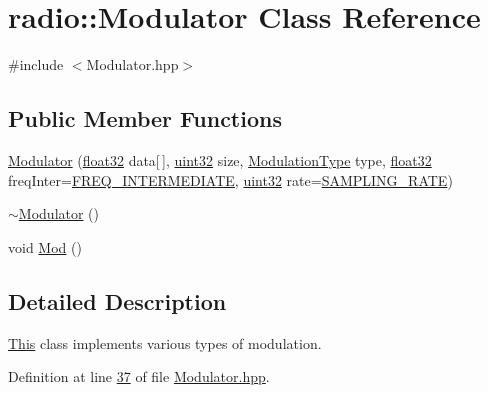 \hypertarget{classradio_1_1Modulator}{\section{radio\+:\+:Modulator Class Reference}
\label{classradio_1_1Modulator}
}


{\ttfamily \#include $<$Modulator.\+hpp$>$}

\subsection*{Public Member Functions}
\begin{DoxyCompactItemize}
\item 
\hyperlink{classradio_1_1Modulator_ab202651b368986cc76673b6e997550b8}{Modulator} (\hyperlink{definitions_8hpp_aacdc525d6f7bddb3ae95d5c311bd06a1}{float32} data\mbox{[}$\,$\mbox{]}, \hyperlink{definitions_8hpp_a1134b580f8da4de94ca6b1de4d37975e}{uint32} size, \hyperlink{namespaceradio_a46fb7299001138f28b7f69975c58399e}{Modulation\+Type} type, \hyperlink{definitions_8hpp_aacdc525d6f7bddb3ae95d5c311bd06a1}{float32} freq\+Inter=\hyperlink{namespaceradio_aa82ddc6ba206798fd70ffc25665b3cb6}{F\+R\+E\+Q\+\_\+\+I\+N\+T\+E\+R\+M\+E\+D\+I\+A\+T\+E}, \hyperlink{definitions_8hpp_a1134b580f8da4de94ca6b1de4d37975e}{uint32} rate=\hyperlink{namespaceradio_a284213fea4beed2f74bb936927cbe654}{S\+A\+M\+P\+L\+I\+N\+G\+\_\+\+R\+A\+T\+E})
\item 
\hyperlink{classradio_1_1Modulator_a712e6e110c57b29ebdd754bd34bf269b}{$\sim$\+Modulator} ()
\item 
void \hyperlink{classradio_1_1Modulator_ab5eac6e4900579486b5871b48e64cdab}{Mod} ()
\end{DoxyCompactItemize}


\subsection{Detailed Description}
\hyperlink{namespaceThis}{This} class implements various types of modulation. 

Definition at line \hyperlink{Modulator_8hpp_source_l00037}{37} of file \hyperlink{Modulator_8hpp_source}{Modulator.\+hpp}.



